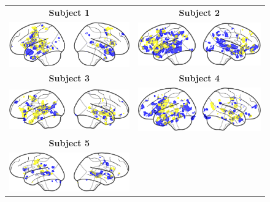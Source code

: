 \begin{figure}[ht]
\scriptsize
\hspace{-4ex}
\begin{tabular}{cc}
\textbf{\Large Subject 1} & \textbf{\Large Subject 2}\\
{\includegraphics[width=.5\linewidth]{figures/part_II/searchlight-regions_01.pdf}}
\hspace{-1ex}
&{\includegraphics[width=.5\linewidth]{figures/part_II/searchlight-regions_03.pdf}}
\hspace{-1ex}\\
\rule{0pt}{6ex}
\textbf{\Large Subject 3} & \textbf{\Large Subject 4}\\
{\includegraphics[width=.5\linewidth]{figures/part_II/searchlight-regions_04.pdf}}
\hspace{-1ex}
&{\includegraphics[width=.5\linewidth]{figures/part_II/searchlight-regions_05.pdf}}
\hspace{-1ex}\\
\rule{0pt}{6ex}
\textbf{\Large Subject 5} & {}\\
{\includegraphics[width=.5\linewidth]{figures/part_II/searchlight-regions_06.pdf}}
\hspace{-1ex}

\end{tabular}
\end{figure}
